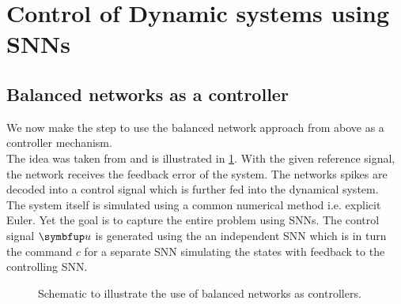 \section{Control of Dynamic systems using \acp{SNN}}\label{sec:control}
\subsection{Balanced networks as a controller}
We now make the step to use the balanced network approach from above as a controller mechanism.\\
The idea was taken from \cite{huang_optimizing_2017} and is illustrated in \cref{fig:schematic}. With the given reference signal, the network receives the feedback error of the system. The networks spikes are decoded into a control signal which is further fed into the dynamical system.\\
The system itself is simulated using a common numerical method i.e. explicit Euler. Yet the goal is to capture the entire problem using \acp{SNN}. The control signal $\bmu{u}$ is generated using the an independent \ac{SNN} which is in turn the command $c$ for a separate \ac{SNN} simulating the states with feedback to the controlling \ac{SNN}.
\begin{figure}
	\centering
	\caption{Schematic to illustrate the use of balanced networks as controllers.}
	\label{fig:schematic}
\end{figure}
